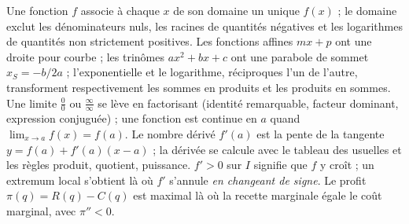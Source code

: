 \begin{aretirer}
Une fonction $f$ associe à chaque $x$ de son domaine un unique $f(x)$ ; le domaine exclut les dénominateurs nuls, les racines de quantités négatives et les logarithmes de quantités non strictement positives. Les fonctions affines $mx + p$ ont une droite pour courbe ; les trinômes $ax^{2}+bx+c$ ont une parabole de sommet $x_S = -b/2a$ ; l'exponentielle et le logarithme, réciproques l'un de l'autre, transforment respectivement les sommes en produits et les produits en sommes. Une limite $\frac{0}{0}$ ou $\frac{\infty}{\infty}$ se lève en factorisant (identité remarquable, facteur dominant, expression conjuguée) ; une fonction est continue en $a$ quand $\lim_{x \to a} f(x) = f(a)$. Le nombre dérivé $f'(a)$ est la pente de la tangente $y = f(a) + f'(a)(x-a)$ ; la dérivée se calcule avec le tableau des usuelles et les règles produit, quotient, puissance. $f' > 0$ sur $I$ signifie que $f$ y croît ; un extremum local s'obtient là où $f'$ s'annule \emph{en changeant de signe}. Le profit $\pi(q) = R(q) - C(q)$ est maximal là où la recette marginale égale le coût marginal, avec $\pi'' < 0$.
\end{aretirer}
